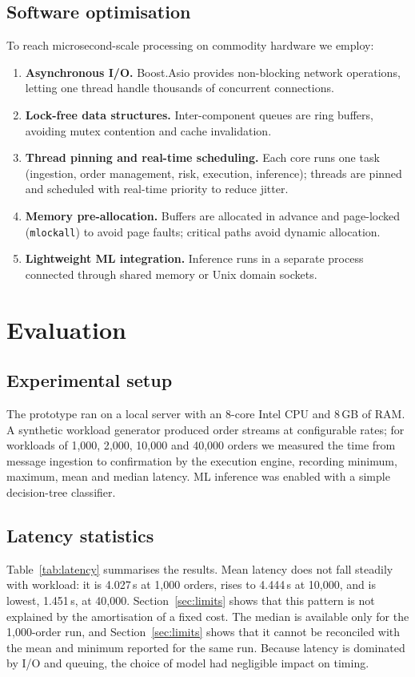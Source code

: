 \documentclass[10pt,a4paper,twocolumn]{article}
\newcommand{\us}{\,\textmu s}
\begin{document}
\subsection{Software optimisation}
To reach microsecond-scale processing on commodity hardware we employ:
\begin{enumerate}
  \item \textbf{Asynchronous I/O.} Boost.Asio provides non-blocking network operations,
        letting one thread handle thousands of concurrent connections.
  \item \textbf{Lock-free data structures.} Inter-component queues are ring buffers,
        avoiding mutex contention and cache invalidation.
  \item \textbf{Thread pinning and real-time scheduling.} Each core runs one task
        (ingestion, order management, risk, execution, inference); threads are pinned and
        scheduled with real-time priority to reduce jitter.
  \item \textbf{Memory pre-allocation.} Buffers are allocated in advance and page-locked
        (\texttt{mlockall}) to avoid page faults; critical paths avoid dynamic allocation.
  \item \textbf{Lightweight ML integration.} Inference runs in a separate process connected
        through shared memory or Unix domain sockets.
\end{enumerate}

\section{Evaluation}\label{sec:eval}
\subsection{Experimental setup}
The prototype ran on a local server with an 8-core Intel CPU and 8\,GB of RAM. A synthetic
workload generator produced order streams at configurable rates; for workloads of 1{,}000,
2{,}000, 10{,}000 and 40{,}000 orders we measured the time from message ingestion to
confirmation by the execution engine, recording minimum, maximum, mean and median latency.
ML inference was enabled with a simple decision-tree classifier.

\subsection{Latency statistics}
Table~\ref{tab:latency} summarises the results. Mean latency does not fall steadily with
workload: it is 4.027\us{} at 1{,}000 orders, rises to 4.444\us{} at 10{,}000, and is lowest,
1.451\us, at 40{,}000. Section~\ref{sec:limits} shows that this pattern is not explained by
the amortisation of a fixed cost. The median is available only for the 1{,}000-order run, and
Section~\ref{sec:limits} shows that it cannot be reconciled with the mean and minimum reported
for the same run. Because latency is dominated by I/O and queuing, the choice of model had
negligible impact on timing.
\end{document}
